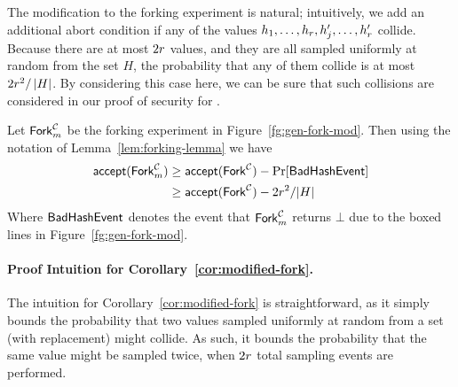 The modification to the forking experiment is natural;
intuitively,
we add an additional abort condition if any of the values $h_1, \ldots, h_{r}, h_j', \ldots, h_{r}'$ collide.
Because there are at most $2r$ values, and they are all sampled uniformly at random from the set $H$,
the probability that any of them collide is at most $2r^2/\left\lvert H\right\rvert$.
By considering this case here,
we can be sure that such collisions are considered in our proof of security for \glitter.

\begin{corollary} \label{cor:modified-fork}
    Let $\mathsf{Fork}_m^{\mathcal{C}}$ be the forking experiment in Figure~\ref{fg:gen-fork-mod}.
    Then using the notation of Lemma~\ref{lem:forking-lemma} we have
    \begin{align} \label{eq:bound-mod-fork}
    \begin{split}
        \mathsf{accept}(\mathsf{Fork}_m^{\mathcal{C}}) & \geq \mathsf{accept}(\mathsf{Fork}^{\mathcal{C}}) - \Pr[\mathsf{BadHashEvent}]   \\
        & \geq \mathsf{accept}(\mathsf{Fork}^{\mathcal{C}}) - 2r^2/\lvert H \rvert
    \end{split}
    \end{align}
    Where $\mathsf{BadHashEvent}$ denotes the event that $\mathsf{Fork}_m^{\mathcal{C}}$ returns $\bot$ due to the boxed lines in Figure~\ref{fg:gen-fork-mod}.
\end{corollary}

\paragraph{Proof Intuition for Corollary~\ref{cor:modified-fork}.}
The intuition for Corollary~\ref{cor:modified-fork} is straightforward,
as it simply bounds the probability that two values sampled uniformly at random from a set (with replacement) might collide.
As such,
it bounds the probability that the same value might be sampled twice,
when $2r $ total sampling events are performed.


